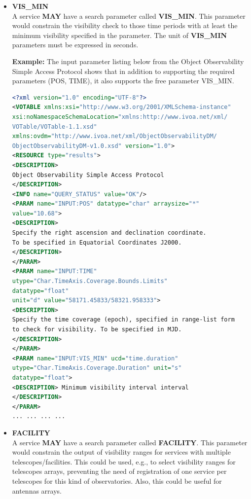 \documentclass[11pt,a4paper]{ivoatex/ivoa}
\begin{document}
\begin{itemize}
\item{\textbf{VIS\_MIN}\\A service \textbf{MAY} have a search parameter
called \textbf{VIS\_MIN}. This parameter would constrain the visibility
check to those time periods with at least the minimum visibility specified
in the parameter. The unit of \textbf{VIS\_MIN} parameters must be expressed
in seconds.\par
\textbf{Example:} The input parameter listing below from the Object
Observability Simple Access Protocol shows that in addition to supporting
the required parameters (POS, TIME), it also supports the free
parameter VIS\_MIN.
\begin{lstlisting}[language=XML]
<?xml version="1.0" encoding="UTF-8"?>
<VOTABLE xmlns:xsi="http://www.w3.org/2001/XMLSchema-instance"
xsi:noNamespaceSchemaLocation="xmlns:http://www.ivoa.net/xml/
VOTable/VOTable-1.1.xsd"
xmlns:ovdm="http://www.ivoa.net/xml/ObjectObservabilityDM/
ObjectObservabilityDM-v1.0.xsd" version="1.0">
<RESOURCE type="results">
<DESCRIPTION>
Object Observability Simple Access Protocol
</DESCRIPTION>
<INFO name="QUERY_STATUS" value="OK"/>
<PARAM name="INPUT:POS" datatype="char" arraysize="*"
value="10.68">
<DESCRIPTION>
Specify the right ascension and declination coordinate.
To be specified in Equatorial Coordinates J2000.
</DESCRIPTION>
</PARAM>
<PARAM name="INPUT:TIME"
utype="Char.TimeAxis.Coverage.Bounds.Limits"
datatype="float"
unit="d" value="58171.45833/58321.958333">
<DESCRIPTION>
Specify the time coverage (epoch), specified in range-list form
to check for visibility. To be specified in MJD.
</DESCRIPTION>
</PARAM>
<PARAM name="INPUT:VIS_MIN" ucd="time.duration"
utype="Char.TimeAxis.Coverage.Duration" unit="s"
datatype="float">
<DESCRIPTION> Minimum visibility interval interval
</DESCRIPTION>
</PARAM>
... ... ... ...
\end{lstlisting}

}
\item{\textbf{FACILITY}\\A service \textbf{MAY} have a search parameter
called \textbf{FACILITY}. This parameter would constrain the output of
visibility ranges for services with multiple telescopes/facilities.
This could be used, e.g., to select visibility ranges for telescopes
arrays, preventing the need of registration of one service per telescopes
for this kind of observatories. Also, this could be useful for antennas
arrays.}
\end{itemize}
\end{document}
